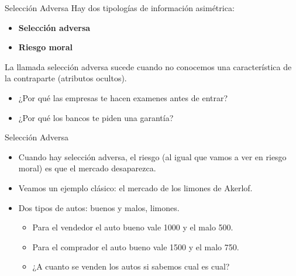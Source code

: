 \documentclass{beamer}
\begin{document}
\begin{frame}{Selección Adversa}
    Hay dos tipologías de información asimétrica:
    \begin{itemize}
        \item \textbf{Selección adversa}
        \item \textbf{Riesgo moral}
    \end{itemize}
    \begin{boxA}
        \centering
        La llamada selección adversa sucede cuando no conocemos una característica de la contraparte (atributos ocultos).
    \end{boxA}
    \vspace{-2mm}
    \centering
    \vspace{-10mm}
    \begin{itemize}
        \item ¿Por qué las empresas te hacen examenes antes de entrar?
        \item ¿Por qué los bancos te piden una garantía?
    \end{itemize}
\end{frame}

\begin{frame}{Selección Adversa}
    \begin{itemize}
        \item Cuando hay selección adversa, el riesgo (al igual que vamos a ver en riesgo moral) es que el mercado desaparezca.
        \item Veamos un ejemplo clásico: el mercado de los limones de Akerlof.
        \item Dos tipos de autos: buenos y malos, limones.
        \begin{itemize}
            \item Para el vendedor el auto bueno vale 1000 y el malo 500.
            \item Para el comprador el auto bueno vale 1500 y el malo 750.
            \item ¿A cuanto se venden los autos si sabemos cual es cual?
        \end{itemize}
    \end{itemize}
\end{frame}
\end{document}
